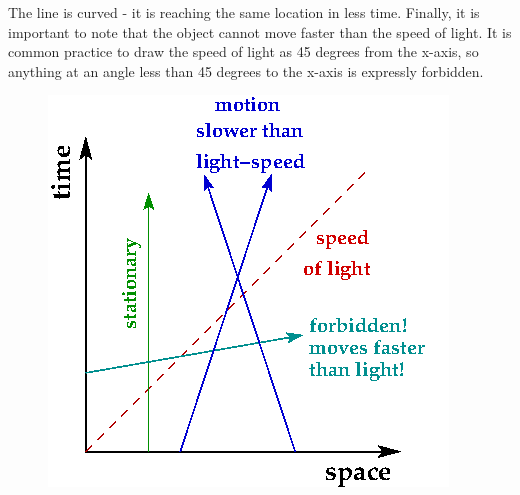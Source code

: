 The line is curved - it is reaching the same location in less time. Finally, it is important to note that the object cannot move
faster than the speed of light. It is common practice to draw the speed of light as 45 degrees from the x-axis, so anything at an
angle less than 45 degrees to the x-axis is expressly forbidden.
\begin{figure}[H]
\includegraphics[scale=0.5]{light.png}
\end{figure}
